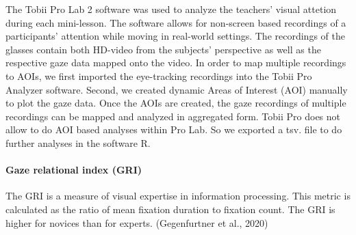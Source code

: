 \documentclass[
  english,
  man,floatsintext]{apa6}
\let\oldparagraph\paragraph
\renewcommand{\paragraph}[1]{\oldparagraph{#1}\mbox{}}
\begin{document}
The Tobii Pro Lab 2 software was used to analyze the teachers' visual attetion during each mini-lesson. The software allows for non-screen based recordings of a participants' attention while moving in real-world settings. The recordings of the glasses contain both HD-video from the subjects' perspective as well as the respective gaze data mapped onto the video. In order to map multiple recordings to AOIs, we first imported the eye-tracking recordings into the Tobii Pro Analyzer software. Second, we created dynamic Areas of Interest (AOI) manually to plot the gaze data. Once the AOIs are created, the gaze recordings of multiple recordings can be mapped and analyzed in aggregated form. Tobii Pro does not allow to do AOI based analyses within Pro Lab. So we exported a tsv. file to do further analyses in the software R.

\hypertarget{gaze-relational-index-gri}{%
\paragraph{Gaze relational index (GRI)}\label{gaze-relational-index-gri}}

The GRI is a measure of visual expertise in information processing. This metric is calculated as the ratio of mean fixation duration to fixation count. The GRI is higher for novices than for experts. (Gegenfurtner et al., 2020)
\end{document}
